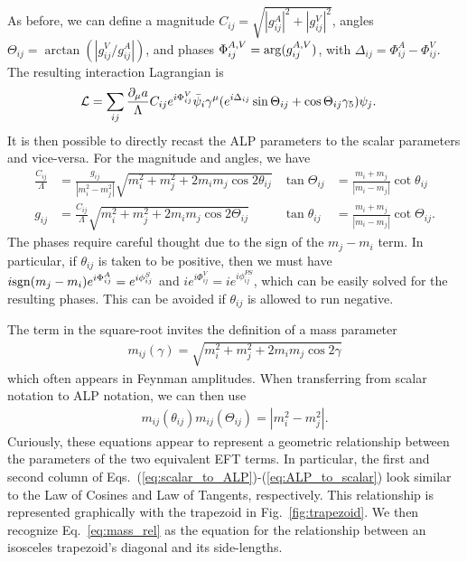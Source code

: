 {As before, we can define a magnitude $C_{ij} = \sqrt{|g_{ij}^A|^2 + |g_{ij}^V|^2}$,  angles $\Theta_{ij} = \arctan(|g_{ij}^{V}/g_{ij}^A|)$, and phases $\Phi_{ij}^{A,V} ={\rm arg}(g_{ij}^{A,V})$, with $\Delta_{ij} = \Phi_{ij}^A - \Phi_{ij}^V$. The resulting interaction Lagrangian is
\begin{align}
    {\cal L} &= \sum_{ij}\frac{\partial_\mu a}{\Lambda}C_{ij}e^{i\Phi_{ij}^V}\bar{\psi}_i\gamma^\mu(e^{i\Delta_{ij}}\sin{\Theta_{ij}} +\cos{\Theta_{ij}}\gamma_5)\psi_j.
\end{align}
It is then possible to directly recast the ALP parameters to the scalar parameters and vice-versa. For the magnitude and angles, we have
\begin{align}
    \frac{C_{ij}}{\Lambda} &= \frac{g_{ij}}{|m_i^2 - m_j^2|}\sqrt{m_i^2+m_j^2+2m_im_j\cos{2\theta_{ij}}} & \tan{\Theta_{ij}} &= \frac{m_i+m_j}{\left|m_i-m_j\right|}\cot{\theta_{ij}}\label{eq:scalar_to_ALP}
    \\
    g_{ij} &= \frac{C_{ij}}{\Lambda}\sqrt{m_i^2+m_j^2+2m_im_j\cos{2\Theta_{ij}}} & \tan{\theta_{ij}} &= \frac{m_i+m_j}{\left|m_i-m_j\right|}\cot{\Theta_{ij}}. \label{eq:ALP_to_scalar}
\end{align}
The phases require careful thought due to the sign of the $m_j - m_i$ term. In particular, if $\theta_{ij}$ is taken to be positive, then we must have $i{\rm sgn}(m_j - m_i)e^{i\Phi_{ij}^A} = e^{i\phi_{ij}^S}$ and $ie^{i\Phi_{ij}^V} = ie^{i\phi_{ij}^{PS}}$, which can be easily solved for the resulting phases. This can be avoided if $\theta_{ij}$ is allowed to run negative.

The term in the square-root invites the definition of a mass parameter 
\begin{align}
    m_{ij}(\gamma) = \sqrt{m_i^2 + m_j^2 + 2m_i m_j \cos{2\gamma}}
\end{align}
which often appears in Feynman amplitudes. When transferring from scalar notation to ALP notation, we can then use 
\begin{align}
    m_{ij}(\theta_{ij})m_{ij}(\Theta_{ij}) = |m_i^2 - m_j^2|.\label{eq:mass_rel}
\end{align}
Curiously, these equations appear to represent a geometric relationship between the parameters of the two equivalent EFT terms. In particular, the first and second column of Eqs.~(\ref{eq:scalar_to_ALP})-(\ref{eq:ALP_to_scalar}) look similar to the Law of Cosines and Law of Tangents, respectively. This relationship is represented graphically with the trapezoid in Fig.~\ref{fig:trapezoid}. We then recognize Eq.~\ref{eq:mass_rel} as the equation for the relationship between an isosceles trapezoid's diagonal and its side-lengths.

}
